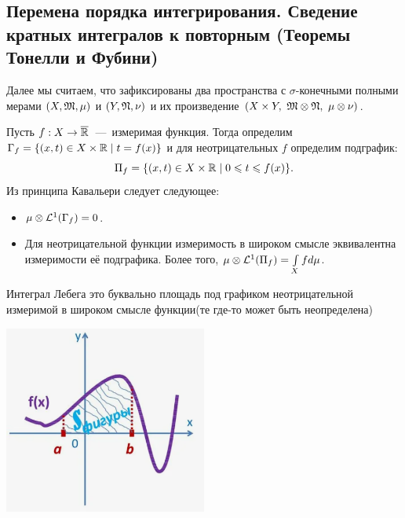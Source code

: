 \subsection{Перемена порядка интегрирования. Сведение кратных интегралов к повторным (Теоремы Тонелли и Фубини)}
Далее мы считаем, что зафиксированы два пространства с $\sigma$-конечными полными мерами $(X, \mathfrak{M}, \mu)$ и $(Y, \mathfrak{N}, \nu)$ и их произведение $(X \times Y, \ \mathfrak{M} \otimes \mathfrak{N}, \ \mu \otimes \nu)$.
\begin{corollary}
    Пусть $f: X \rightarrow \overline{\mathbb{R}}$~---~измеримая функция. Тогда определим $\Gamma_f = \{(x, t) \in X \times \mathbb{R} \mid t = f(x) \}$ и для неотрицательных $f$ определим подграфик: $$\Pi_f = \{(x, t) \in X \times \mathbb{R} \mid 0 \leqslant t \leqslant f(x) \}.$$ Из принципа Кавальери следует следующее:
    \begin{itemize}
        \item $\mu \otimes \mathcal{L}^1(\Gamma_f) = 0$.
        \item Для неотрицательной функции измеримость в широком смысле эквивалентна измеримости её подграфика. Более того, $\mu \otimes \mathcal{L}^1(\Pi_f) = \int\limits_X fd\mu$.
    \end{itemize}

\begin{minipage}{0.5\textwidth}\raggedleft
Интеграл Лебега это буквально площадь под графиком неотрицательной измеримой в широком смысле функции(те где-то может быть неопределена)
\end{minipage}    
\begin{minipage}{0.5\textwidth}%
    \includegraphics[width=0.5\textwidth]{images/Integral.png} 
\end{minipage}%

\end{corollary}
\hfill%

